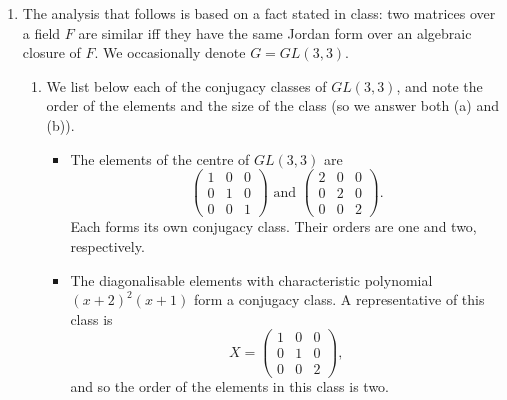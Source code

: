\documentclass[11pt]{article} \usepackage{amssymb}
\begin{document}
\begin{enumerate}
\begin{enumerate}
  \end{enumerate}
  \item

    The analysis that follows is based on a fact stated in class: 
    two matrices over a field $F$ are similar iff they have the same
    Jordan form over an algebraic closure of $F$. We occasionally 
    denote $G=GL(3,3)$.
    \begin{enumerate}
    \item 
      We list below each of the conjugacy classes of $GL(3,3)$, and note
      the order of the elements and the size of the class (so we answer
      both (a) and (b)).
      \begin{itemize}
      \item The elements of the centre of $GL(3,3)$ are
        \begin{equation*}
          \begin{pmatrix}
            1&0  &0 \\ 
            0&1  &0 \\ 
            0&0  &1 
          \end{pmatrix}
          \mbox{ and }
          \begin{pmatrix}
            2&0  &0 \\ 
            0&2  &0 \\ 
            0&0  &2 
          \end{pmatrix}.
        \end{equation*}
        Each forms its own conjugacy class. Their orders are one
        and two, respectively. 
      \item
        The diagonalisable elements with characteristic polynomial $(x+2)^2(x+1)$
        form a conjugacy class. A representative of this class  is
        \begin{equation*}
          X=
          \begin{pmatrix}
            1&0  &0 \\ 
            0&1  &0 \\ 
            0&0  &2 
          \end{pmatrix},
        \end{equation*}
        and so the order of the elements in this class is two.
        

\end{itemize}
\end{enumerate}
\end{enumerate}
\end{document}
